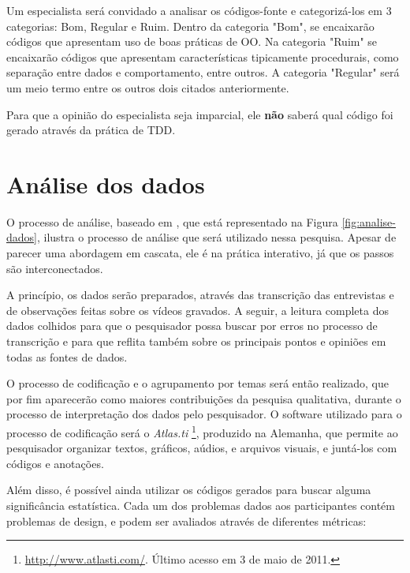 Um especialista será convidado a analisar os códigos-fonte e categorizá-los
em 3 categorias: Bom, Regular e Ruim. Dentro da categoria "Bom", se encaixarão códigos 
que apresentam uso de boas práticas de OO. Na categoria "Ruim" se encaixarão códigos
que apresentam características tipicamente procedurais, como separação entre
dados e comportamento, entre outros. A categoria "Regular" será um meio termo entre
os outros dois citados anteriormente.

Para que a opinião do especialista seja imparcial, ele \textbf{não} saberá qual código
foi gerado através da prática de TDD.

\section{Análise dos dados}
\label{sec:planejamento-analise}

O processo de análise, baseado em \cite{creswell}, que está representado na
Figura \ref{fig:analise-dados}, ilustra o processo de análise que será utilizado
nessa pesquisa. Apesar de parecer uma abordagem em cascata, ele é na prática 
interativo, já que os passos são interconectados. 

A princípio, os dados serão preparados, através das transcrição das
entrevistas e de observações feitas sobre os vídeos gravados. 
A seguir, a leitura completa dos
dados colhidos para que o pesquisador possa buscar por erros no processo de
transcrição e para que reflita também sobre os principais pontos e opiniões em
todas as fontes de dados.

O processo de codificação e o agrupamento
por temas será então realizado, que por fim aparecerão como maiores
contribuições da pesquisa qualitativa, durante o processo de interpretação dos
dados pelo pesquisador. O software utilizado para o processo de codificação será
o \textit{Atlas.ti} \footnote{\url{http://www.atlasti.com/}. Último acesso em 3
de maio de 2011.}, produzido na Alemanha, que permite ao pesquisador organizar textos,
gráficos, aúdios, e arquivos visuais, e juntá-los com códigos e anotações. 

Além disso, é possível ainda utilizar os códigos gerados para buscar alguma significância
estatística. Cada um dos problemas dados aos participantes contém problemas de design, e
podem ser avaliados através de diferentes métricas:

